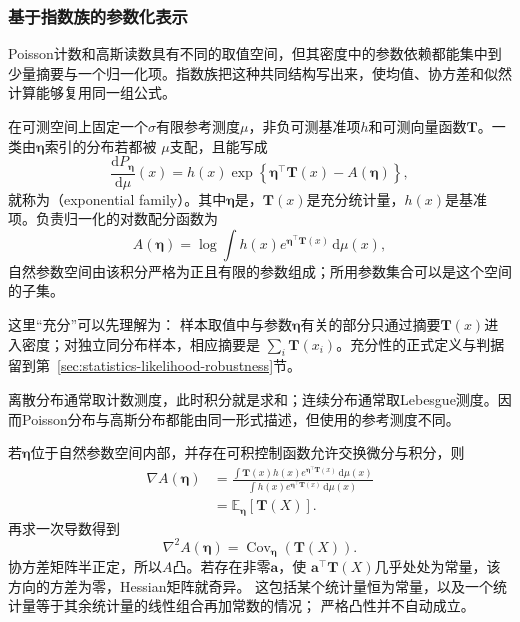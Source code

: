 \subsubsection{基于指数族的参数化表示}
Poisson计数和高斯读数具有不同的取值空间，但其密度中的参数依赖都能集中到少量摘要与一个归一化项。指数族把这种共同结构写出来，使均值、协方差和似然计算能够复用同一组公式。
\begin{definition}[指数族]
  \label{def:probability-exponential-family}
在可测空间上固定一个\(\sigma\)有限参考测度\(\mu\)，非负可测基准项\(h\)和可测向量函数\(\bm T\)。一类由\(\bm{\eta}\)索引的分布若都被
\(\mu\)支配，且能写成
\begin{equation}
  \frac{\mathrm{d}P_{\bm{\eta}}}{\mathrm{d}\mu}(x)
  =
  h(x)\exp\left\{
    \bm{\eta}^{\top}\bm{T}(x)-A(\bm{\eta})
  \right\},
  \label{eq:probability-exponential-family}
\end{equation}
就称为（exponential family）。其中\(\bm{\eta}\)是，\(\bm{T}(x)\)是充分统计量，\(h(x)\)是基准项。负责归一化的对数配分函数为
\[ A(\bm{\eta})
  =\log\int h(x)e^{\bm{\eta}^{\top}\bm{T}(x)}\,\mathrm{d}\mu(x), \]
自然参数空间由该积分严格为正且有限的参数组成；所用参数集合可以是这个空间的子集。
\end{definition}
这里“充分”可以先理解为：
样本取值中与参数\(\bm{\eta}\)有关的部分只通过摘要\(\bm{T}(x)\)进入密度；对独立同分布样本，相应摘要是
\(\sum_i\bm{T}(x_i)\)。充分性的正式定义与判据留到第~\ref{sec:statistics-likelihood-robustness}节。

离散分布通常取计数测度，此时积分就是求和；连续分布通常取Lebesgue测度。因而Poisson分布与高斯分布都能由同一形式描述，但使用的参考测度不同。

若\(\bm{\eta}\)位于自然参数空间内部，并存在可积控制函数允许交换微分与积分，则
\[
\begin{aligned}
  \nabla A(\bm{\eta})
  &=
  \frac{\int \bm{T}(x)h(x)
  e^{\bm{\eta}^{\top}\bm{T}(x)}\,\mathrm{d}\mu(x)}
  {\int h(x)e^{\bm{\eta}^{\top}\bm{T}(x)}\,\mathrm{d}\mu(x)}\\
  &=
  \mathbb{E}_{\bm{\eta}}[\bm{T}(X)].
\end{aligned}
\]
再求一次导数得到
\begin{equation}
  \nabla^2 A(\bm{\eta})
  =
  \operatorname{Cov}_{\bm{\eta}}(\bm{T}(X)).
  \label{eq:probability-log-partition-hessian}
\end{equation}
协方差矩阵半正定，所以\(A\)凸。若存在非零\(\bm a\)，使
\(\bm a^\top\bm T(X)\)几乎处处为常量，该方向的方差为零，Hessian矩阵就奇异。
这包括某个统计量恒为常量，以及一个统计量等于其余统计量的线性组合再加常数的情况；
严格凸性并不自动成立。

